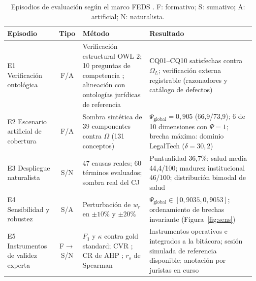 \documentclass[computers,article,submit,pdftex,moreauthors]{Definitions/mdpi}
\begin{document}
\begin{table}[H]
\caption{Episodios de evaluación según el marco FEDS \cite{Venable2016}. F: formativo; S: sumativo; A: artificial; N: naturalista.}
\label{tab:feds}
\begin{tabularx}{\textwidth}{p{3.1cm}cp{3.9cm}X}
\toprule
\textbf{Episodio} & \textbf{Tipo} & \textbf{Método} & \textbf{Resultado}\\
\midrule
E1 Verificación ontológica & F/A & Verificación estructural OWL 2; 10 preguntas de competencia \cite{Uschold1996}; alineación con ontologías jurídicas de referencia & CQ01--CQ10 satisfechas contra $\Omega_L$; verificación externa registrable (razonadores y catálogo de defectos)\\
E2 Escenario artificial de cobertura & F/A & Sombra sintética de 39 componentes contra $\Omega$ (131 conceptos) & $\Psi_{\mathrm{global}} = 0{,}905$ (66{,}9/73{,}9); 6 de 10 dimensiones con $\Psi = 1$; brecha máxima: dominio LegalTech ($\delta = 30{,}2$)\\
E3 Despliegue naturalista & S/N & 47 causas reales; 60 términos evaluados; sombra real del CJ & Puntualidad 36{,}7\%; salud media 44{,}4/100; madurez institucional 46/100; distribución bimodal de salud\\
E4 Sensibilidad y robustez & S/A & Perturbación de $w_r$ en $\pm 10\%$ y $\pm 20\%$ & $\Psi_{\mathrm{global}} \in [0{,}9035, 0{,}9053]$; ordenamiento de brechas invariante (Figura~\ref{fig:sens})\\
E5 Instrumentos de validez experta & F$\to$S/N & $F_1$ y $\kappa$ \cite{Cohen1960} contra gold standard; CVR \cite{Lawshe1975}; CR de AHP \cite{Saaty1990}; $r_s$ de Spearman \cite{Spearman1904} & Instrumentos operativos e integrados a la bitácora; sesión simulada de referencia disponible; anotación por juristas en curso\\
\bottomrule
\end{tabularx}
\end{table}
\end{document}
